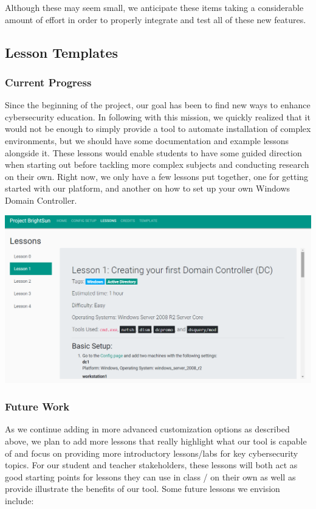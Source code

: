 \documentclass[openright]{report}
\begin{document}
\noindent Although these may seem small, we anticipate these items taking a considerable amount of effort in order to properly integrate and test all of these new features.

\subsection{Lesson Templates}

\subsubsection{Current Progress}
Since the beginning of the project, our goal has been to find new ways to enhance cybersecurity education. In following with this mission, we quickly realized that it would not be enough to simply provide a tool to automate installation of complex environments, but we should have some documentation and example lessons alongside it. These lessons would enable students to have some guided direction when starting out before tackling more complex subjects and conducting research on their own. Right now, we only have a few lessons put together, one for getting started with our platform, and another on how to set up your own Windows Domain Controller.

\begin{center}
    \includegraphics[scale=0.50]{images/lesson.png}
    \label{config}
\end{center}

\subsubsection{Future Work}
As we continue adding in more advanced customization options as described above, we plan to add more lessons that really highlight what our tool is capable of and focus on providing more introductory lessons/labs for key cybersecurity topics. For our student and teacher stakeholders, these lessons will both act as good starting points for lessons they can use in class / on their own as well as provide illustrate the benefits of our tool. Some future lessons we envision include:
\end{document}
